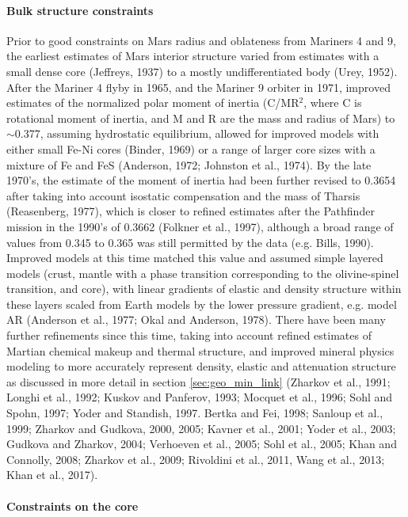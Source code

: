 \paragraph{Bulk structure constraints}
Prior to good constraints on Mars radius and oblateness from Mariners 4 and 9, the earliest estimates of Mars interior structure varied from estimates with a small dense core (Jeffreys, 1937) to a mostly undifferentiated body (Urey, 1952).  After the Mariner 4 flyby in 1965, and the Mariner 9 orbiter in 1971, improved estimates of the normalized polar moment of inertia (C/MR$^2$, where C is rotational moment of inertia, and M and R are the mass and radius of Mars) to $\sim$0.377, assuming hydrostatic equilibrium, allowed for improved models with either small Fe-Ni cores (Binder, 1969) or a range of larger core sizes with a mixture of Fe and FeS (Anderson, 1972; Johnston et al., 1974).  By the late 1970's, the estimate of the moment of inertia had been further revised to 0.3654 after taking into account isostatic compensation and the mass of Tharsis (Reasenberg, 1977), which is closer to refined estimates after the Pathfinder mission in the 1990's of 0.3662 (Folkner et al., 1997), although a broad range of values from 0.345 to 0.365 was still permitted by the data (e.g. Bills, 1990).  Improved models at this time matched this value and assumed simple layered models (crust, mantle with a phase transition corresponding to the olivine-spinel transition, and core), with linear gradients of elastic and density structure within these layers scaled from Earth models by the lower pressure gradient, e.g. model AR (Anderson et al., 1977; Okal and Anderson, 1978).  There have been many further refinements since this time, taking into account refined estimates of Martian chemical makeup and thermal structure, and improved mineral physics modeling to more accurately represent density, elastic and attenuation structure as discussed in more detail in section \ref{sec:geo_min_link} (Zharkov et al., 1991; Longhi et al., 1992; Kuskov and Panferov, 1993; Mocquet et al., 1996; Sohl and Spohn, 1997; Yoder and Standish, 1997. Bertka and Fei, 1998; Sanloup et al., 1999; Zharkov and Gudkova, 2000, 2005; Kavner et al., 2001; Yoder et al., 2003; Gudkova and Zharkov, 2004; Verhoeven et al., 2005; Sohl et al., 2005; Khan and Connolly, 2008; Zharkov et al., 2009; Rivoldini et al., 2011, Wang et al., 2013; Khan et al., 2017). 

\paragraph{Constraints on the core}

